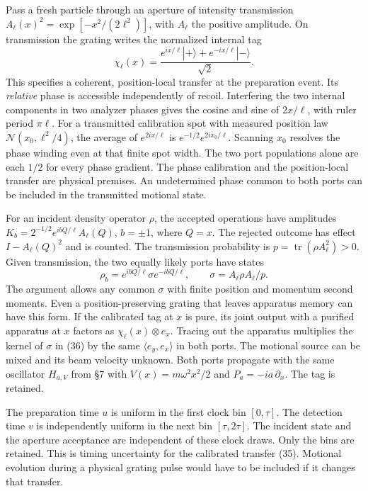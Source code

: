 \documentclass[11pt,a4paper]{article}
\begin{document}
Pass a fresh particle through an aperture of intensity transmission
\(A_\ell(x)^2=\exp[-x^2/(2\ell^2)]\), with \(A_\ell\) the positive
amplitude. On transmission the grating writes the normalized internal
tag \[
 \chi_\ell(x)=
 \frac{e^{ix/\ell}|+\rangle+e^{-ix/\ell}|-\rangle}{\sqrt2}.
 \tag{35}
\] This specifies a coherent, position-local transfer at the preparation
event. Its \emph{relative} phase is accessible independently of recoil.
Interfering the two internal components in two analyzer phases gives the
cosine and sine of \(2x/\ell\), with ruler period \(\pi\ell\). For a
transmitted calibration spot with measured position law
\(\mathcal N(x_0,\ell^2/4)\), the average of \(e^{2ix/\ell}\) is
\(e^{-1/2}e^{2ix_0/\ell}\). Scanning \(x_0\) resolves the phase winding
even at that finite spot width. The two port populations alone are each
\(1/2\) for every phase gradient. The phase calibration and the
position-local transfer are physical premises. An undetermined phase
common to both ports can be included in the transmitted motional state.

For an incident density operator \(\rho\), the accepted operations have
amplitudes \(K_b=2^{-1/2}e^{ibQ/\ell}A_\ell(Q)\), \(b=\pm1\), where
\(Q=x\). The rejected outcome has effect \(I-A_\ell(Q)^2\) and is
counted. The transmission probability is
\(p=\operatorname{tr}(\rho A_\ell^2)>0\). Given transmission, the two
equally likely ports have states \[
 \rho_b=e^{ibQ/\ell}\sigma e^{-ibQ/\ell},\qquad
 \sigma=A_\ell\rho A_\ell/p .
 \tag{36}
\] The argument allows any common \(\sigma\) with finite position and
momentum second moments. Even a position-preserving grating that leaves
apparatus memory can have this form. If the calibrated tag at \(x\) is
pure, its joint output with a purified apparatus at \(x\) factors as
\(\chi_\ell(x)\otimes e_x\). Tracing out the apparatus multiplies the
kernel of \(\sigma\) in (36) by the same \(\langle e_y,e_x\rangle\) in
both ports. The motional source can be mixed and its beam velocity
unknown. Both ports propagate with the same oscillator \(H_{a,V}\) from
§7 with \(V(x)=m\omega^2x^2/2\) and \(P_a=-ia\,\partial_x\). The tag is
retained.

The preparation time \(u\) is uniform in the first clock bin
\([0,\tau]\). The detection time \(v\) is independently uniform in the
next bin \([\tau,2\tau]\). The incident state and the aperture
acceptance are independent of these clock draws. Only the bins are
retained. This is timing uncertainty for the calibrated transfer (35).
Motional evolution during a physical grating pulse would have to be
included if it changes that transfer.
\end{document}
